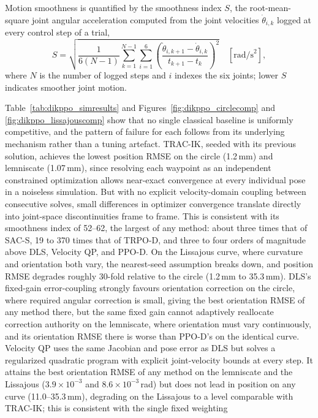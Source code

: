 Motion smoothness is quantified by the smoothness index $S$, the root-mean-square joint angular
acceleration computed from the joint velocities $\dot{\theta}_{i,k}$ logged at every control step of
a trial,
\begin{equation}
S = \sqrt{\frac{1}{6(N-1)}\sum_{k=1}^{N-1}\sum_{i=1}^{6}\left(\frac{\dot{\theta}_{i,k+1}-\dot{\theta}_{i,k}}{t_{k+1}-t_k}\right)^{2}}\quad [\text{rad/s}^{2}],
\label{eq:dikppo_smoothness}
\end{equation}
where $N$ is the number of logged steps and $i$ indexes the six joints; lower $S$ indicates smoother
joint motion.

Table~\ref{tab:dikppo_simresults} and Figures~\ref{fig:dikppo_circlecomp} and
\ref{fig:dikppo_lissajouscomp} show that no single classical baseline is uniformly competitive, and
the pattern of failure for each follows from its underlying mechanism rather than a tuning artefact.
TRAC-IK, seeded with its previous solution, achieves the lowest position RMSE on the circle
(1.2\,mm) and lemniscate (1.07\,mm), since resolving each waypoint as an independent constrained
optimization allows near-exact convergence at every individual pose in a noiseless simulation. But
with no explicit velocity-domain coupling between consecutive solves, small differences in optimizer
convergence translate directly into joint-space discontinuities frame to frame. This is consistent
with its smoothness index of 52--62, the largest of any method: about three times that of SAC-S,
19 to 370 times that of TRPO-D, and three to four orders of magnitude above DLS, Velocity QP, and
PPO-D. On the Lissajous curve, where curvature and orientation both vary, the nearest-seed
assumption breaks down, and position RMSE degrades roughly 30-fold relative to the circle (1.2\,mm
to 35.3\,mm). DLS's fixed-gain error-coupling strongly favours orientation correction on the circle,
where required angular correction is small, giving the best orientation RMSE of any method there,
but the same fixed gain cannot adaptively reallocate correction authority on the lemniscate, where
orientation must vary continuously, and its orientation RMSE there is worse than PPO-D's on the
identical curve. Velocity QP uses the same Jacobian and pose error as DLS but solves a regularized
quadratic program with explicit joint-velocity bounds at every step. It attains the best
orientation RMSE of any method on the lemniscate and the Lissajous ($3.9\times10^{-3}$ and
$8.6\times10^{-3}$\,rad) but does not lead in position on any curve (11.0--35.3\,mm), degrading on
the Lissajous to a level comparable with TRAC-IK; this is consistent with the single fixed weighting
